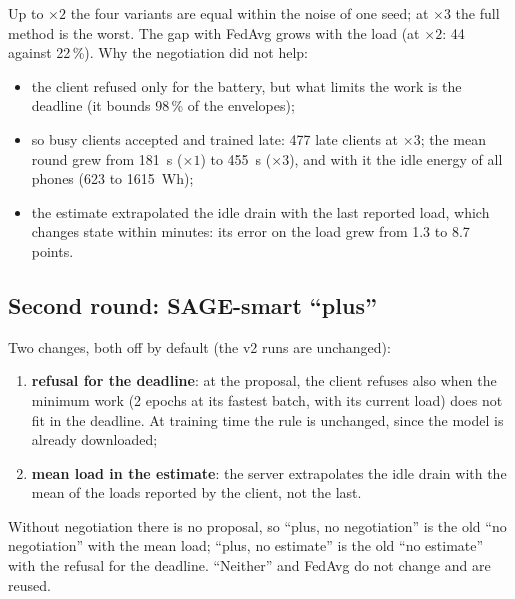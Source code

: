 \documentclass[11pt,a4paper]{article}
\begin{document}
Up to $\times2$ the four variants are equal within the noise of one seed; at
$\times3$ the full method is the worst. The gap with FedAvg grows with the load
(at $\times2$: 44 against 22\,\%). Why the negotiation did not help:
\begin{itemize}
  \item the client refused only for the battery, but what limits the work is
        the deadline (it bounds 98\,\% of the envelopes);
  \item so busy clients accepted and trained late: 477 late clients at $\times3$;
        the mean round grew from 181~s ($\times1$) to 455~s ($\times3$), and with
        it the idle energy of all phones (623 to 1615~Wh);
  \item the estimate extrapolated the idle drain with the last reported load,
        which changes state within minutes: its error on the load grew from 1.3
        to 8.7 points.
\end{itemize}

\subsection{Second round: SAGE-smart ``plus''}
\label{sec:plus}

Two changes, both off by default (the v2 runs are unchanged):
\begin{enumerate}
  \item \textbf{refusal for the deadline}: at the proposal, the client refuses
        also when the minimum work (2 epochs at its fastest batch, with its
        current load) does not fit in the deadline. At training time the rule is
        unchanged, since the model is already downloaded;
  \item \textbf{mean load in the estimate}: the server extrapolates the idle
        drain with the mean of the loads reported by the client, not the last.
\end{enumerate}
Without negotiation there is no proposal, so ``plus, no negotiation'' is the old
``no negotiation'' with the mean load; ``plus, no estimate'' is the old ``no
estimate'' with the refusal for the deadline. ``Neither'' and FedAvg do not
change and are reused.
\end{document}
